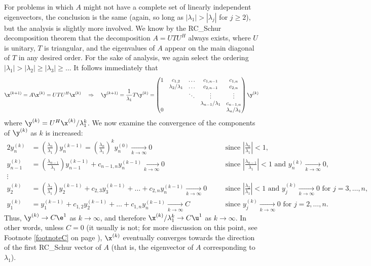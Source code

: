 For problems in which $A$ might not have a complete set of linearly independent eigenvectors, the conclusion is the same (again, so long as
$|\lambda_1|>|\lambda_j|$ for $j\ge 2$), but the analysis is slightly more involved.  We know by the RC_Schur decomposition theorem that
the decomposition $A=UTU^H$ always exists, where $U$ is unitary, $T$ is triangular, and the eigenvalues of $A$ appear on the main diagonal
of $T$ in any desired order.
For the sake of analysis, we again select the ordering $|\lambda_1|>|\lambda_2|\ge|\lambda_3|\ge\ldots$  It follows immediately that
\begin{equation*}
\x^{(k+1)}=A\x^{(k)} = UTU^H \x^{(k)} \quad \Rightarrow \quad \y^{(k+1)}=\frac{1}{\lambda_1} T \y^{(k)} =
\begin{pmatrix} 1 & c_{1,2} & \ldots & c_{1,n-1} & c_{1,n} \\ 
                  & \lambda_2/\lambda_1 & \ldots & c_{2,n-1} & c_{2,n} \\
                  &  & \ddots & \vdots & \vdots \\ 
                  &  &  & \lambda_{n-1}/\lambda_1 & c_{n-1,n} \\ 
                0 &  &  &  & \lambda_n/\lambda_1 \\ \end{pmatrix} \y^{(k)}
\end{equation*} 
where $\y^{(k)}=U^H\x^{(k)}/\lambda^k_1$.  We now examine the convergence of the components of $\y^{(k)}$ as $k$ is increased:
\begin{alignat*}{2}
y_n^{(k)} &= \left(\frac{\lambda_n}{\lambda_1}\right) y_n^{(k-1)}=\left(\frac{\lambda_n}{\lambda_1}\right)^k y_n^{(0)} \xrightarrow[k\rightarrow \infty]{} 0 \quad
&&\textrm{since } \left|\frac{\lambda_n}{\lambda_1}\right|<1, \\
y_{n-1}^{(k)} &= \left(\frac{\lambda_{n-1}}{\lambda_1}\right) y_{n-1}^{(k-1)} + c_{n-1,n} y_{n}^{(k-1)} \xrightarrow[k\rightarrow \infty]{} 0 \quad
&&\textrm{since } \left|\frac{\lambda_{n-1}}{\lambda_1}\right|<1 \textrm{ and } y_n^{(k)} \xrightarrow[k\rightarrow \infty]{} 0,\\
\vdots \\
y_{2}^{(k)} &= \left(\frac{\lambda_{2}}{\lambda_1}\right) y_{2}^{(k-1)} + c_{2,3} y_{3}^{(k-1)}+\ldots+c_{2,n} y_{n}^{(k-1)} \xrightarrow[k\rightarrow \infty]{} 0 \quad
&&\textrm{since } \left|\frac{\lambda_{2}}{\lambda_1}\right|<1 \textrm{ and } y_j^{(k)} \xrightarrow[k\rightarrow \infty]{} 0 \textrm{ for } j=3,\ldots,n,\\
y_{1}^{(k)} &= y_{1}^{(k-1)} + c_{1,2} y_{2}^{(k-1)}+\ldots+c_{1,n} y_{n}^{(k-1)} \xrightarrow[k\rightarrow \infty]{} C \quad
&&\textrm{since } y_j^{(k)} \xrightarrow[k\rightarrow \infty]{} 0 \textrm{ for } j=2,\ldots,n.
\end{alignat*}
Thus, $\y^{(k)}\rightarrow C\e^1$ as $k\rightarrow\infty$, and therefore $\x^{(k)}/\lambda_1^k\rightarrow C\u^1$  as $k\rightarrow\infty$.
In other words, unless $C=0$ (it usually is not; for more discussion on this point, see Footnote \ref{footnoteC} on page \pageref{footnoteC}),
$\x^{(k)}$ eventually converges towards the direction of the first RC_Schur vector of $A$ (that is, the eigenvector of $A$ corresponding to $\lambda_1$).
\vskip0.1in

